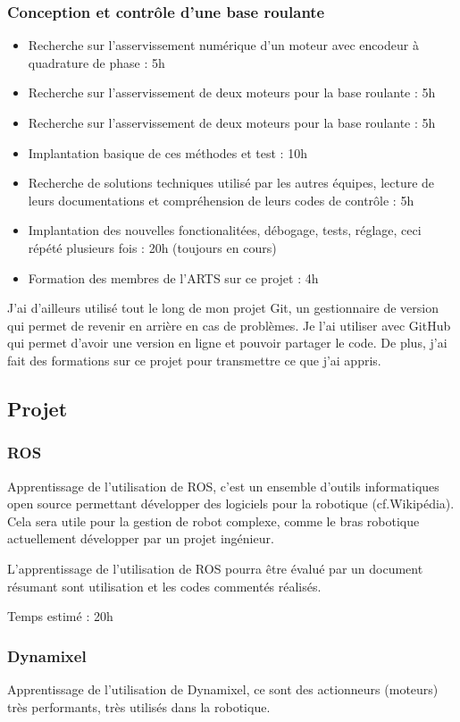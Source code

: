 \documentclass[12pt,a4paper]{article}
\begin{document}
\subsubsection*{Conception et contrôle d'une base roulante}
\begin{itemize}
	\item Recherche sur l'asservissement numérique d'un moteur avec encodeur à quadrature de phase : 5h
	\item Recherche sur l'asservissement de deux moteurs pour la base roulante : 5h
	\item Recherche sur l'asservissement de deux moteurs pour la base roulante : 5h
	\item Implantation basique de ces méthodes et test : 10h
	\item Recherche de solutions techniques utilisé par les autres équipes, lecture de leurs documentations et compréhension de leurs codes de contrôle : 5h
	\item Implantation des nouvelles fonctionalitées, débogage, tests, réglage, ceci répété plusieurs fois : 20h (toujours en cours)
	\item Formation des membres de l'ARTS sur ce projet : 4h
\end{itemize}

J'ai d'ailleurs utilisé tout le long de mon projet Git, un gestionnaire de version qui permet de revenir en arrière en cas de problèmes. Je l'ai utiliser avec GitHub qui permet d'avoir une version en ligne et pouvoir partager le code.
De plus, j'ai fait des formations sur ce projet pour transmettre ce que j'ai appris.

\subsection*{Projet}
\subsubsection*{ROS}
Apprentissage de l'utilisation de ROS, c'est un ensemble d'outils informatiques open source permettant développer des logiciels pour la robotique (cf.Wikipédia). Cela sera utile pour la gestion de robot complexe, comme le bras robotique actuellement développer par un projet ingénieur.

L'apprentissage de l'utilisation de ROS pourra être évalué par un document résumant sont utilisation et les codes commentés réalisés.

Temps estimé : 20h

\subsubsection*{Dynamixel}
Apprentissage de l'utilisation de Dynamixel, ce sont des actionneurs (moteurs) très performants, très utilisés dans la robotique.
\end{document}
